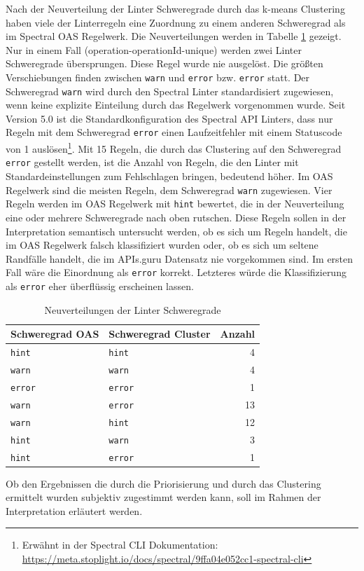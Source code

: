 Nach der Neuverteilung der Linter Schweregrade durch das k-means Clustering haben viele der Linterregeln eine Zuordnung zu einem anderen Schweregrad als im Spectral OAS Regelwerk. Die Neuverteilungen werden in Tabelle \ref{tab:severityreassignments} gezeigt. Nur in einem Fall (operation-operationId-unique) werden zwei Linter Schweregrade übersprungen. Diese Regel wurde nie ausgelöst. Die größten Verschiebungen finden zwischen \texttt{warn} und \texttt{error} bzw. \texttt{error} statt. Der Schweregrad \texttt{warn} wird durch den Spectral Linter standardisiert zugewiesen, wenn keine explizite Einteilung durch das Regelwerk vorgenommen wurde. Seit Version 5.0 ist die Standardkonfiguration des Spectral \acs{API} Linters, dass nur Regeln mit dem Schweregrad \texttt{error} einen Laufzeitfehler mit einem Statuscode von 1 auslösen\footnote{Erwähnt in der Spectral CLI Dokumentation: \href{https://meta.stoplight.io/docs/spectral/9ffa04e052cc1-spectral-cli}{https://meta.stoplight.io/docs/spectral/9ffa04e052cc1-spectral-cli}}. Mit 15 Regeln, die durch das Clustering auf den Schweregrad  \texttt{error} gestellt werden, ist die Anzahl von Regeln, die den Linter mit Standardeinstellungen zum Fehlschlagen bringen, bedeutend höher. Im \acs{OAS} Regelwerk sind die meisten Regeln, dem Schweregrad \texttt{warn} zugewiesen. Vier Regeln werden im \acs{OAS} Regelwerk mit \texttt{hint} bewertet, die in der Neuverteilung eine oder mehrere Schweregrade nach oben rutschen. Diese Regeln sollen in der Interpretation semantisch untersucht werden, ob es sich um Regeln handelt, die im \acs{OAS} Regelwerk falsch klassifiziert wurden oder, ob es sich um seltene Randfälle handelt, die im APIs.guru Datensatz nie vorgekommen sind. Im ersten Fall wäre die Einordnung als \texttt{error} korrekt. Letzteres würde die Klassifizierung als \texttt{error} eher überflüssig erscheinen lassen.

\begin{longtable}{llr}
  \caption{Neuverteilungen der Linter Schweregrade}
  \label{tab:severityreassignments}
  \endfirsthead
  \endhead
  \textbf{Schweregrad \acs{OAS}} & \textbf{Schweregrad Cluster} & \textbf{Anzahl} \\ \hline \hline
  \texttt{hint} & \texttt{hint} & 4 \\
  \texttt{warn} & \texttt{warn} & 4 \\
  \texttt{error} & \texttt{error} & 1 \\
  \texttt{warn} & \texttt{error} & 13 \\
  \texttt{warn} & \texttt{hint} & 12 \\
  \texttt{hint} & \texttt{warn} & 3 \\
  \texttt{hint} & \texttt{error} & 1 \\
  \hline\hline
\end{longtable}

Ob den Ergebnissen die durch die Priorisierung und durch das Clustering ermittelt wurden subjektiv zugestimmt werden kann, soll im Rahmen der Interpretation erläutert werden.
